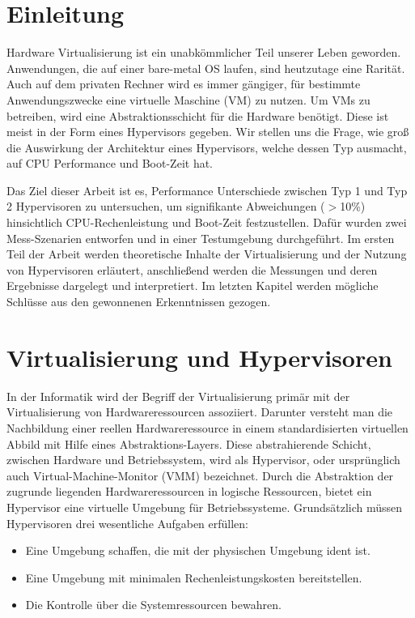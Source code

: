 \documentclass[conference]{IEEEtran}
\begin{document}
\IEEEpeerreviewmaketitle

\section{Einleitung}
\label{Einleitung}
Hardware Virtualisierung ist ein unabkömmlicher Teil unserer Leben geworden. Anwendungen, die auf einer bare-metal OS laufen, sind heutzutage eine Rarität. Auch auf dem privaten Rechner wird es immer gängiger, für bestimmte Anwendungszwecke eine virtuelle Maschine (VM) zu nutzen. Um VMs zu betreiben, wird eine Abstraktionsschicht für die Hardware benötigt. Diese ist meist in der Form eines Hypervisors gegeben. Wir stellen uns die Frage, wie groß die Auswirkung der Architektur eines Hypervisors, welche dessen Typ ausmacht, auf CPU Performance und Boot-Zeit hat. 

Das Ziel dieser Arbeit ist es, Performance Unterschiede zwischen Typ 1 und Typ 2 Hypervisoren zu untersuchen, um signifikante Abweichungen ($>$10\%) hinsichtlich CPU-Rechenleistung und Boot-Zeit festzustellen. Dafür wurden zwei Mess-Szenarien entworfen und in einer Testumgebung durchgeführt. Im ersten Teil der Arbeit werden theoretische Inhalte der Virtualisierung und der Nutzung von Hypervisoren erläutert, anschließend werden die Messungen und deren Ergebnisse dargelegt und interpretiert. Im letzten Kapitel werden mögliche Schlüsse aus den gewonnenen Erkenntnissen gezogen.

\section{Virtualisierung und Hypervisoren}
\label{Virtualisierung und Hypervisoren}	
In der Informatik wird der Begriff der Virtualisierung primär mit der Virtualisierung von Hardwareressourcen assoziiert. Darunter versteht man die Nachbildung einer reellen Hardwareressource in einem standardisierten virtuellen Abbild mit Hilfe eines Abstraktions-Layers. Diese abstrahierende Schicht, zwischen Hardware und Betriebssystem, wird als Hypervisor, oder ursprünglich auch Virtual-Machine-Monitor (VMM) bezeichnet. \cite{Portnoy2016} Durch die Abstraktion der zugrunde liegenden Hardwareressourcen in logische Ressourcen, bietet ein Hypervisor eine virtuelle Umgebung für Betriebssysteme. Grundsätzlich müssen Hypervisoren drei wesentliche Aufgaben erfüllen: 
\begin{itemize}
	\item Eine Umgebung schaffen, die mit der physischen Umgebung ident ist. 
	\item Eine Umgebung mit minimalen Rechenleistungskosten bereitstellen. 
	\item Die Kontrolle über die Systemressourcen bewahren. 
\end{itemize}
\cite{Popek&Goldberg1974}
\end{document}
